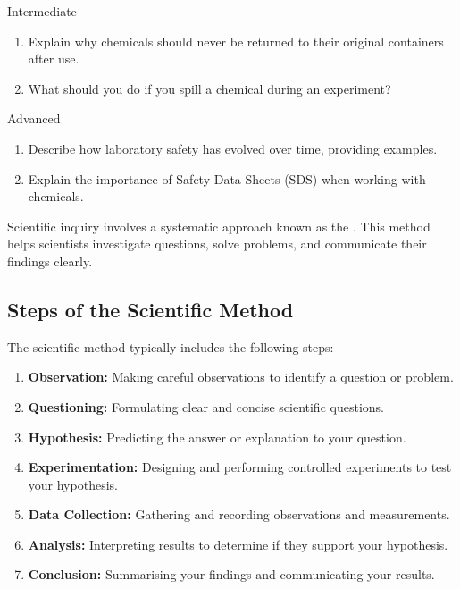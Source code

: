 \begin{tieredquestions}{Intermediate}
\begin{enumerate}
    \item Explain why chemicals should never be returned to their original containers after use.
    \item What should you do if you spill a chemical during an experiment?
\end{enumerate}
\end{tieredquestions}

\begin{tieredquestions}{Advanced}
\begin{enumerate}
    \item Describe how laboratory safety has evolved over time, providing examples.
    \item Explain the importance of Safety Data Sheets (SDS) when working with chemicals.
\end{enumerate}
\end{tieredquestions}

\FloatBarrier
\1

Scientific inquiry involves a systematic approach known as the . This method helps scientists investigate questions, solve problems, and communicate their findings clearly.

\subsection{Steps of the Scientific Method}

The scientific method typically includes the following steps:

\begin{enumerate}
    \item \textbf{Observation:} Making careful observations to identify a question or problem.
    \item \textbf{Questioning:} Formulating clear and concise scientific questions.
    \item \textbf{Hypothesis:} Predicting the answer or explanation to your question.
    \item \textbf{Experimentation:} Designing and performing controlled experiments to test your hypothesis.
    \item \textbf{Data Collection:} Gathering and recording observations and measurements.
    \item \textbf{Analysis:} Interpreting results to determine if they support your hypothesis.
    \item \textbf{Conclusion:} Summarising your findings and communicating your results.
\end{enumerate}

